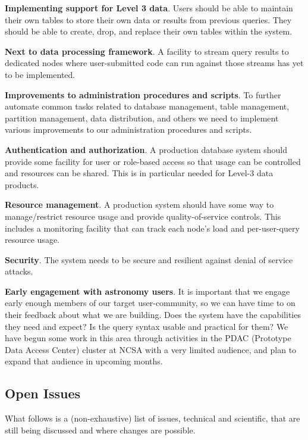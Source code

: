 \documentclass[DM,toc]{lsstdoc}
\begin{document}
\textbf{Implementing support for Level 3 data}. Users should be able to
maintain their own tables to store their own data or results from previous
queries. They should be able to create, drop, and replace their own tables
within the system.

\textbf{Next to data processing framework}. A facility to stream query
results to dedicated nodes where user-submitted code can run against
those streams has yet to be implemented.

\textbf{Improvements to administration procedures and scripts}. To further
automate common tasks related to database management, table management,
partition management, data distribution, and others we need to implement
various  improvements to our administration procedures and scripts.

\textbf{Authentication and authorization}. A production database system should
provide some facility for user or role-based access so that usage can be
controlled and resources can be shared. This is in particular needed for
Level-3 data products.

\textbf{Resource management}. A production system should have some way
to manage/restrict resource usage and provide quality-of-service
controls. This includes a monitoring facility that can track each node's
load and per-user-query resource usage.

\textbf{Security}. The system needs to be secure and resilient against
denial of service attacks.

\textbf{Early engagement with astronomy users}.  It is important that we
engage early enough members of our target user-community, so we can have
time to on their feedback about what we are building.  Does the system
have the capabilities they need and expect?  Is the query syntax usable and
practical for them?  We have begun some work in this area through activities
in the PDAC (Prototype Data Access Center) cluster at NCSA with a very
limited audience, and plan to expand that audience in upcoming months.

\subsection{Open Issues}\label{open-issues}

What follows is a (non-exhaustive) list of issues, technical and scientific,
that are still being discussed and where changes are possible.
\end{document}
